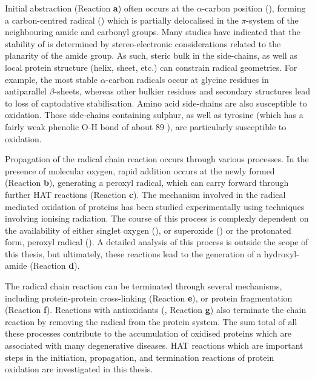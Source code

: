 Initial abstraction (Reaction \textbf{a}) often occurs at the $\alpha$-carbon position (), forming a carbon-centred radical () which is partially delocalised in the $\pi$-system of the neighbouring amide and carbonyl groups. Many studies have indicated that the stability of  is determined by stereo-electronic considerations related to the planarity of the amide group. As such, steric bulk in the side-chains, as well as local protein structure (helix, sheet, etc.) can constrain radical geometries. For example, the most stable $\alpha$-carbon radicals occur at glycine residues in antiparallel $\beta$-sheets, whereas other bulkier residues and secondary structures lead to loss of captodative stabilisation.\cite{Rauk2000} Amino acid side-chains are also susceptible to oxidation. Those side-chains containing sulphur,\cite{Stadtman2004} as well as tyrosine (which has a fairly weak phenolic O-H bond of about 89 \kcalmol),\cite{Mulder2005} are particularly susceptible to oxidation.

Propagation of the radical chain reaction occurs through various processes. In the presence of molecular oxygen, rapid addition occurs at the newly formed  (Reaction \textbf{b}), generating a peroxyl radical, which can carry forward through further HAT reactions (Reaction \textbf{c}).\cite{Stadtman2003} The mechanism involved in the radical mediated oxidation of proteins has been studied experimentally using techniques involving ionising radiation.\cite{Garrison1962,Garrison1987} The course of this process is complexly dependent on the availability of either singlet oxygen (), or superoxide () or the protonated form, peroxyl radical (). A detailed analysis of this process is outside the scope of this thesis, but ultimately, these reactions lead to the generation of a hydroxyl-amide (Reaction \textbf{d}).

The radical chain reaction can be terminated through several mechanisms, including protein-protein cross-linking (Reaction \textbf{e}), or protein fragmentation (Reaction \textbf{f}). Reactions with antioxidants (, Reaction \textbf{g}) also terminate the chain reaction by removing the radical from the protein system. The sum total of all these processes contribute to the accumulation of oxidised proteins which are associated with many degenerative diseases.\cite{Halliwell2006} HAT reactions which are important steps in the initiation, propagation, and termination reactions of protein oxidation are investigated in this thesis.


